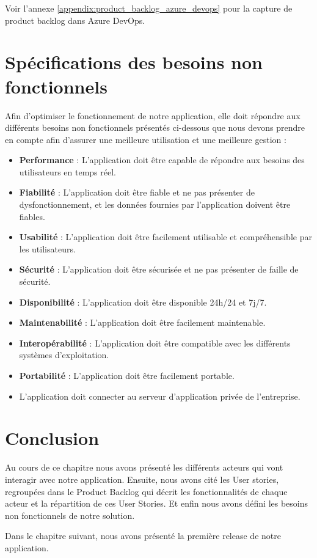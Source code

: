 Voir l'annexe \ref{appendix:product_backlog_azure_devops} pour la capture de product backlog dans Azure DevOps.

\section{Spécifications des besoins non fonctionnels}
Afin d'optimiser le fonctionnement de notre application, elle doit répondre aux différents besoins non fonctionnels présentés ci-dessous que nous devons prendre en compte afin d'assurer une meilleure utilisation et une meilleure gestion :

\begin{itemize}
\item \textbf{Performance} : L'application doit être capable de répondre aux besoins des utilisateurs en temps réel.
\item \textbf{Fiabilité} : L'application doit être fiable et ne pas présenter de dysfonctionnement, et les données fournies par l'application doivent être fiables.
\item \textbf{Usabilité} : L'application doit être facilement utilisable et compréhensible par les utilisateurs.
\item \textbf{Sécurité} : L'application doit être sécurisée et ne pas présenter de faille de sécurité.
\item \textbf{Disponibilité} : L'application doit être disponible 24h/24 et 7j/7.
\item \textbf{Maintenabilité} : L'application doit être facilement maintenable.
\item \textbf{Interopérabilité} : L'application doit être compatible avec les différents systèmes d'exploitation.
\item \textbf{Portabilité} : L'application doit être facilement portable.
\item L'application doit connecter au serveur d'application privée de l'entreprise.
\end{itemize}

\section*{Conclusion}
Au cours de ce chapitre nous avons présenté les différents acteurs qui vont interagir avec notre application. Ensuite, nous avons cité les User stories, regroupées dans le Product Backlog qui décrit les fonctionnalités de chaque acteur et la répartition de ces User Stories. Et enfin nous avons défini les besoins non fonctionnels de notre solution.

Dans le chapitre suivant, nous avons présenté la première release de notre application.